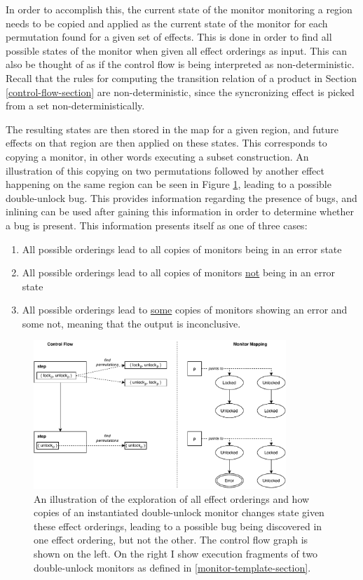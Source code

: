\newpar In order to accomplish this, the current state of the monitor monitoring a region needs to be copied and applied as the current state of the monitor for each permutation found for a given set of effects. This is done in order to find all possible states of the monitor when given all effect orderings as input. This can also be thought of as if the control flow is being interpreted as non-deterministic. Recall that the rules for computing the transition relation of a product in Section \ref{control-flow-section} are non-deterministic, since the syncronizing effect is picked from a set non-deterministically.

\newpar The resulting states are then stored in the map for a given region, and future effects on that region are then applied on these states. This corresponds to copying a monitor, in other words executing a subset construction. An illustration of this copying on two permutations followed by another effect happening on the same region can be seen in Figure \ref{permutation-copy}, leading to a possible double-unlock bug. This provides information regarding the presence of bugs, and inlining can be used after gaining this information in order to determine whether a bug is present. This information presents itself as one of three cases: 

\begin{enumerate}
    \item All possible orderings lead to all copies of monitors being in an error state 
    \item All possible orderings lead to all copies of monitors \underline{not} being in an error state 
    \item All possible orderings lead to \underline{some} copies of monitors showing an error and some not, meaning that the output is inconclusive.
\end{enumerate}

\begin{figure}[H]
    \centering
    \includegraphics[width=0.85\textwidth]{implementation/figures/permutation-copy}
    \caption{An illustration of the exploration of all effect orderings and how copies of an instantiated double-unlock monitor changes state given these effect orderings, leading to a possible bug being discovered in one effect ordering, but not the other. The control flow graph is shown on the left. On the right I show execution fragments of two double-unlock monitors as defined in \ref{monitor-template-section}.}
    \label{permutation-copy}
\end{figure}

